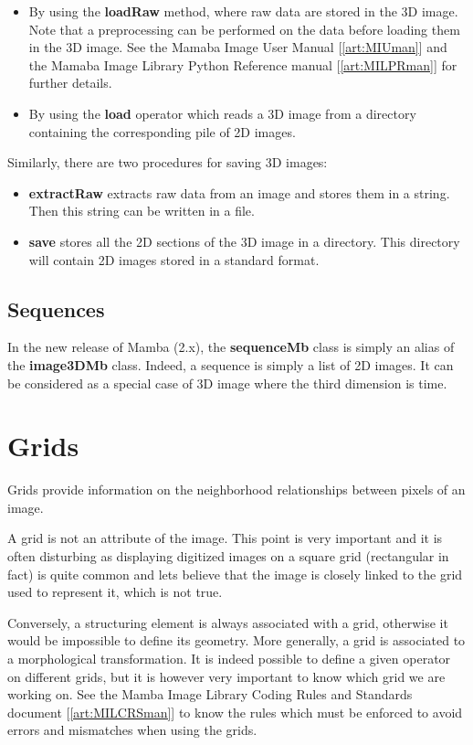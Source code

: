 \documentclass[a4paper,10pt,oneside]{article}
\begin{document}
\begin{itemize}
\item By using the \textbf{loadRaw} method, where raw data are stored in the 3D image. Note that a preprocessing can
be performed on the data before loading them in the 3D image. See the Mamaba Image User Manual [\ref{art:MIUman}]
and the Mamaba Image Library Python Reference manual [\ref{art:MILPRman}] for further details. 
\item By using the \textbf{load} operator which reads a 3D image from a directory containing the corresponding pile
of 2D images.
\end{itemize}

Similarly, there are two procedures for saving 3D images:

\begin{itemize}
\item \textbf{extractRaw} extracts raw data from an image and stores them in a string. Then this string can be
written in a file.  
\item \textbf{save} stores all the 2D sections of the 3D image in a directory. This directory will contain 2D images
stored in a standard format.
\end{itemize}

\subsection{Sequences}
In the new release of Mamba (2.x), the \textbf{sequenceMb} class is simply an alias of the \textbf{image3DMb} class.
Indeed, a sequence is simply a list of 2D images. It can be considered as a special case of 3D image where
the third dimension is time.

\section{Grids}
Grids provide information on the neighborhood relationships between pixels of an image.

A grid is not an attribute of the image. This point is very important and it is often disturbing as
displaying digitized images on a square grid (rectangular in fact) is quite common and lets believe that
the image is closely linked to the grid used to represent it, which is not true.

Conversely, a structuring element is always associated with a grid, otherwise it would be impossible
to define its geometry. More generally, a grid is associated to a morphological transformation. It is
indeed possible to define a given operator on different grids, but it is however very important to
know which grid we are working on. See the Mamba Image Library Coding Rules and Standards document [\ref{art:MILCRSman}] to
know the rules which must be enforced to avoid errors and mismatches when using the grids.
\end{document}
